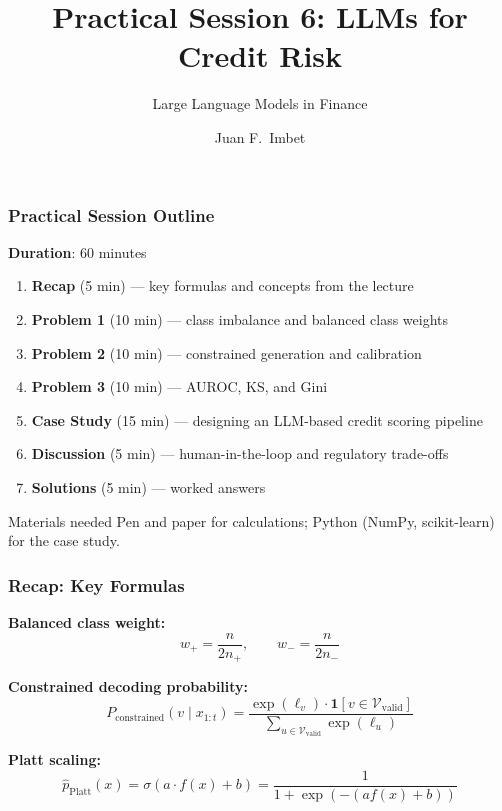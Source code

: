 \documentclass[9pt,t]{beamer}
\title{Practical Session 6: LLMs for Credit Risk}
\subtitle{Large Language Models in Finance}
\author{Juan F.\ Imbet}
\institute{Paris Dauphine -- PSL University}
\date{}
\begin{document}
\begin{frame}
\frametitle{}
\titlepage
\end{frame}

\begin{frame}
\frametitle{Practical Session Outline}

\textbf{Duration}: 60 minutes

\begin{enumerate}
  \item \textbf{Recap} (5 min) — key formulas and concepts from the lecture
  \item \textbf{Problem 1} (10 min) — class imbalance and balanced class weights
  \item \textbf{Problem 2} (10 min) — constrained generation and calibration
  \item \textbf{Problem 3} (10 min) — AUROC, KS, and Gini
  \item \textbf{Case Study} (15 min) — designing an LLM-based credit scoring pipeline
  \item \textbf{Discussion} (5 min) — human-in-the-loop and regulatory trade-offs
  \item \textbf{Solutions} (5 min) — worked answers
\end{enumerate}

\medskip
\begin{block}{Materials needed}
  Pen and paper for calculations; Python (NumPy, scikit-learn) for the case study.
\end{block}
\end{frame}

\begin{frame}
\frametitle{Recap: Key Formulas}

\textbf{Balanced class weight:}
\[
  w_+ = \frac{n}{2 n_+}, \qquad w_- = \frac{n}{2 n_-}
\]

\textbf{Constrained decoding probability:}
\[
  P_{\text{constrained}}(v \mid x_{1:t}) = \frac{\exp(\ell_v) \cdot \mathbf{1}[v \in \mathcal{V}_{\text{valid}}]}{\sum_{u \in \mathcal{V}_{\text{valid}}} \exp(\ell_u)}
\]

\textbf{Platt scaling:}
\[
  \hat{p}_{\text{Platt}}(x) = \sigma(a \cdot f(x) + b) = \frac{1}{1 + \exp(-(a f(x) + b))}
\]
\end{frame}
\end{document}
